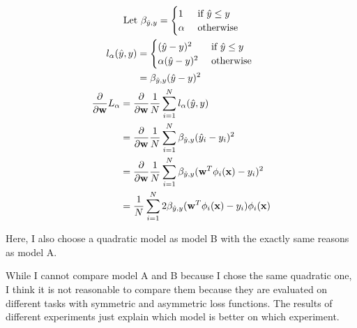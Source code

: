\documentclass{introtosml}
\newcommand\fancyb{\beta_{\hat{y}, y}}
\begin{document}
\begin{p}
  \item
    \begin{gather*}
      \text{Let} \fancyb = \begin{cases}
        1 & \mif \hat{y} \le y \\
        \alpha & \otherwise
      \end{cases} \\
      \begin{aligned}
        l_\alpha(\hat{y}, y)
        & = \begin{cases}
          (\hat{y} - y)^2 & \mif \hat{y} \le y \\
          \alpha (\hat{y} - y)^2 & \otherwise
        \end{cases} \\
        & = \fancyb (\hat{y} - y)^2
      \end{aligned} \\
      \begin{aligned}
        \frac{\partial}{\partial \vec{w}} L_\alpha
        & = \frac{\partial}{\partial \vec{w}}
            \frac{1}{N} \sum_{i=1}^N l_\alpha(\hat{y}, y) \\
        & = \frac{\partial}{\partial \vec{w}}
            \frac{1}{N} \sum_{i=1}^N \fancyb (\hat{y}_i - y_i)^2 \\
        & = \frac{\partial}{\partial \vec{w}}
            \frac{1}{N} \sum_{i=1}^N \fancyb (\vec{w}^T \phi_i(\vec{x}) - y_i)^2 \\
            & = \frac{1}{N} \sum_{i=1}^N 2 \fancyb (\vec{w}^T \phi_i(\vec{x}) - y_i) \phi_i(\vec{x}) \\
      \end{aligned}
    \end{gather*}

    Here, I also choose a quadratic model as model B with the exactly same reasons as model A.

    While I cannot compare model A and B because I chose the same quadratic one,
    I think it is not reasonable to compare them because they are evaluated
    on different tasks with symmetric and asymmetric loss functions.
    The results of different experiments just explain which model is better
    on which experiment.
\end{p}
\end{document}
